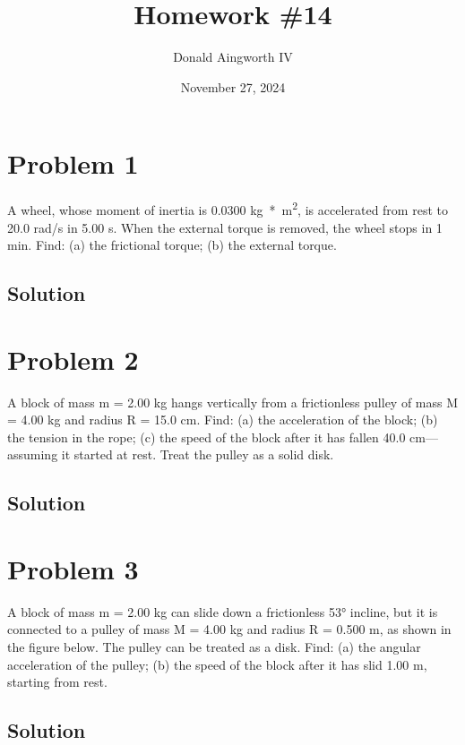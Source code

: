 \documentclass[12pt]{article}
\title{Homework \#14}
\author{Donald Aingworth IV}
\date{November 27, 2024}
\begin{document}

\maketitle

\pagebreak

\section{Problem 1}
A wheel, whose moment of inertia is 0.0300 \unit{\kilo\gram*\meter^2}, is accelerated from rest to 20.0 rad/s in 5.00 s. When the external torque is removed, the wheel stops in 1 min. Find: (a) the frictional torque; (b) the external torque.

\subsection{Solution}


\pagebreak

\section{Problem 2}
A block of mass m = 2.00 kg hangs vertically from a frictionless pulley of mass M = 4.00 kg and radius R = 15.0 cm. Find: (a) the acceleration of the block; (b) the tension in the rope; (c) the speed of the block after it has fallen 40.0 cm—assuming it started at rest. Treat the pulley as a solid disk.

\subsection{Solution}


\pagebreak

\section{Problem 3}
A block of mass m = 2.00 kg can slide down a frictionless 53\unit{\degree} incline, but it is connected to a pulley of mass M = 4.00 kg and radius R = 0.500 m, as shown in the figure below. The pulley can be treated as a disk. Find: (a) the angular acceleration of the pulley; (b) the speed of the block after it has slid 1.00 m, starting from rest.


\subsection{Solution}
\end{document}
